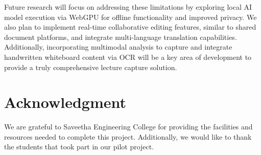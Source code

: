 \documentclass[runningheads]{llncs}
\begin{document}
Future research will focus on addressing these limitations by exploring local AI model execution via WebGPU for offline functionality and improved privacy. We also plan to implement real-time collaborative editing features, similar to shared document platforms, and integrate multi-language translation capabilities. Additionally, incorporating multimodal analysis to capture and integrate handwritten whiteboard content via OCR will be a key area of development to provide a truly comprehensive lecture capture solution.

\section*{Acknowledgment}
We are grateful to Saveetha Engineering College for providing the facilities and resources needed to complete this project. Additionally, we would like to thank the students that took part in our pilot project.
\end{document}
